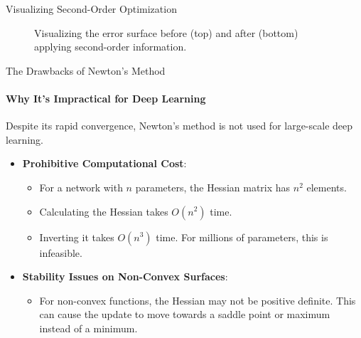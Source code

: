 \begin{frame}{Visualizing Second-Order Optimization}
\begin{figure}
        \caption{Visualizing the error surface before (top) and after (bottom) applying second-order information.}
    \end{figure}
    
\end{frame}





\begin{frame}{The Drawbacks of Newton's Method}
    \framesubtitle{Why It's Impractical for Deep Learning}
    Despite its rapid convergence, Newton's method is not used for large-scale deep learning.
    \begin{itemize}
        \item \textbf{Prohibitive Computational Cost}:
        \begin{itemize}
            \item For a network with $n$ parameters, the Hessian matrix has $n^2$ elements.
            \item Calculating the Hessian takes $O(n^2)$ time.
            \item Inverting it takes $O(n^3)$ time. For millions of parameters, this is infeasible.
        \end{itemize}
        \item \textbf{Stability Issues on Non-Convex Surfaces}:
        \begin{itemize}
            \item For non-convex functions, the Hessian may not be positive definite. This can cause the update to move towards a saddle point or maximum instead of a minimum.
        \end{itemize}
    \end{itemize}
\end{frame}

